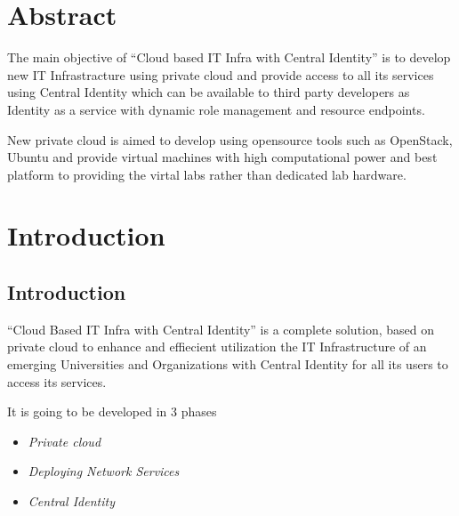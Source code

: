 \documentclass[12pt]{report}
\begin{document}
 
\chapter*{Abstract}
\setcounter{page}{1}
\normalsize
\hspace{0.5cm} The main objective of ``Cloud based IT Infra with Central Identity'' is to develop new IT Infrastracture using private cloud and provide access to all its services using 
Central Identity which can be available to third party developers  as Identity as a service with dynamic role management and resource endpoints. \newline

New private cloud is aimed to develop using opensource tools such as OpenStack, Ubuntu and provide  virtual machines with high computational power and best platform to providing the virtal labs rather than dedicated lab hardware.

\setcounter{page}{2}
\tableofcontents
\pagebreak \thispagestyle{empty} \pagebreak

 
\setcounter{page}{1}


\chapter{Introduction}

\section{Introduction}
	``Cloud Based IT Infra with Central Identity'' is a complete solution, based on private cloud to enhance and effiecient utilization the IT Infrastructure of an emerging Universities and Organizations with Central Identity for all its users to access its services.\newline

	It is going to be developed in 3 phases 
	\begin{itemize}
		\item \textit{Private cloud} 
		\item \textit{Deploying Network Services} 
		\item \textit{Central Identity}
	\end{itemize}
	
\end{document}

